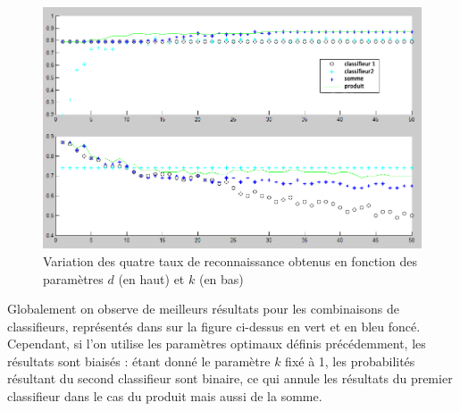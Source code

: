 \begin{figure}[h]
	\begin{center}
		\includegraphics[width=\textwidth]{img/40-rates-function-of-d-k.png}
	\end{center}
	\caption{Variation des quatre taux de reconnaissance obtenus en fonction des paramètres $d$ (en haut) et $k$ (en bas)}
	\label{fig:ratecomparison}
\end{figure}

Globalement on observe de meilleurs résultats pour les combinaisons de classifieurs, représentés dans sur la figure ci-dessus en vert et en bleu foncé. Cependant, si l'on utilise les paramètres optimaux définis précédemment, les résultats sont biaisés : étant donné le paramètre $k$ fixé à 1, les probabilités résultant du second classifieur sont binaire, ce qui annule les résultats du premier classifieur dans le cas du produit mais aussi de la somme.
